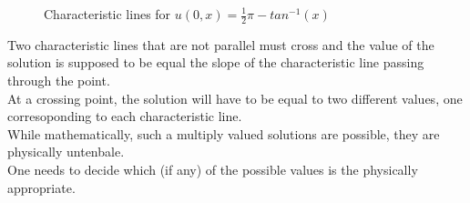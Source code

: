 \begin{example}[]{}
\begin{figure}[H]
	\caption{Characteristic lines for $
    u(0,x)=\frac{1}{2}\pi-tan^{-1}(x)
$ }
	\label{img:cline}
\end{figure}
Two characteristic lines that are not parallel must cross and the value of the solution is supposed to be equal the slope of the characteristic line passing through the point.\\
At a crossing point, the solution will have to be equal to two different values, one corresoponding to each characteristic line.\\
While mathematically, such a multiply valued solutions are possible, they are physically untenbale.\\
One needs to decide which (if any) of the possible values is the physically appropriate.\\
\end{example}
